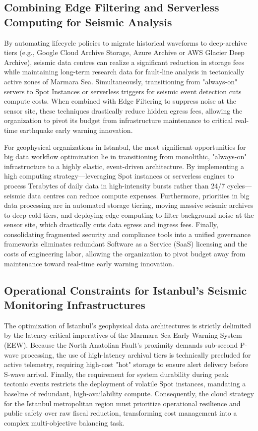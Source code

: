 \documentclass[data,article,submit,pdftex,moreauthors]{Definitions/mdpi}
\begin{document}
\subsection{Combining Edge Filtering and Serverless Computing for Seismic Analysis}

By automating lifecycle policies to migrate historical waveforms to deep-archive tiers (e.g., Google Cloud Archive Storage, Azure Archive or AWS Glacier Deep Archive), seismic data centres can realize a significant reduction in storage fees while maintaining long-term research data for fault-line analysis in tectonically active zones of Marmara Sea. Simultaneously, transitioning from "always-on" servers to Spot Instances or serverless triggers for seismic event detection cuts compute costs. When combined with Edge Filtering to suppress noise at the sensor site, these techniques drastically reduce hidden egress fees, allowing the organization to pivot its budget from infrastructure maintenance to critical real-time earthquake early warning innovation.

For geophysical organizations in Istanbul, the most significant opportunities for big data workflow optimization lie in transitioning from monolithic, "always-on" infrastructure to a highly elastic, event-driven architecture. By implementing a high computing strategy—leveraging Spot instances or serverless engines to process Terabytes of daily data in high-intensity bursts rather than 24/7 cycles—seismic data centres can reduce compute expenses. Furthermore, priorities in big data processing are in automated storage tiering, moving massive seismic archives to deep-cold tiers, and deploying edge computing to filter background noise at the sensor site, which drastically cuts data egress and ingress fees. Finally, consolidating fragmented security and compliance tools into a unified governance frameworks eliminates redundant Software as a Service (SaaS) licensing and the costs of engineering labor, allowing the organization to pivot budget away from maintenance toward real-time early warning innovation.

\subsection{Operational Constraints for Istanbul’s Seismic Monitoring Infrastructures}
The optimization of Istanbul’s geophysical data architectures is strictly delimited by the latency-critical imperatives of the Marmara Sea Early Warning System (EEW). Because the North Anatolian Fault’s proximity demands sub-second P-wave processing, the use of high-latency archival tiers is technically precluded for active telemetry, requiring high-cost "hot" storage to ensure alert delivery before S-wave arrival. Finally, the requirement for system durability during peak tectonic events restricts the deployment of volatile Spot instances, mandating a baseline of redundant, high-availability compute. Consequently, the cloud strategy for the Istanbul metropolitan region must prioritize operational resilience and public safety over raw fiscal reduction, transforming cost management into a complex multi-objective balancing task.
\end{document}
